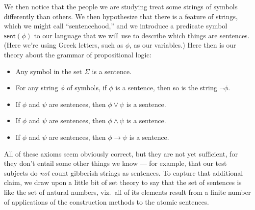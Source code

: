 We then notice that the people we are studying treat some strings of
symbols differently than others.  We then hypothesize that there is a
feature of strings, which we might call ``sentencehood,'' and we
introduce a predicate symbol $\mathsf{sent}(\phi )$ to our language
that we will use to describe which things are sentences.  (Here we're
using Greek letters, such as $\phi$, as our variables.)  Here then is
our theory about the grammar of propositional logic:
\begin{itemize}
\item Any symbol in the set $\Sigma$ is a sentence.  
\item For any string $\phi$ of symbols, if $\phi$ is a sentence, then
  so is the string $\neg \phi$.
\item If $\phi$ and $\psi$ are sentences, then $\phi\vee\psi$ is a
  sentence.
\item If $\phi$ and $\psi$ are sentences, then $\phi\wedge\psi$ is a
  sentence.
\item If $\phi$ and $\psi$ are sentences, then $\phi\to\psi$ is a
  sentence.
\end{itemize}
All of these axioms seem obviously correct, but they are not yet
sufficient, for they don't entail some other things we know --- for
example, that our test subjects do {\it not} count gibberish strings
as sentences.  To capture that additional claim, we draw upon a little
bit of set theory to say that the set of sentences is like the set of
natural numbers, viz.\ all of its elements result from a finite number
of applications of the construction methods to the atomic sentences.

